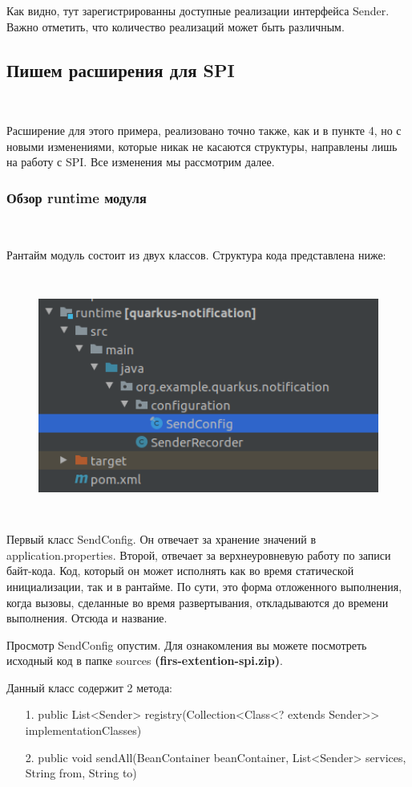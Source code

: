 \documentclass[russian,11pt]{article}
\begin{document}
Как видно, тут зарегистрированны доступные реализации интерфейса Sender. Важно отметить, что количество реализаций может быть различным.

\subsection{Пишем расширения для SPI}
~

Расширение для этого примера, реализовано точно также, как и в пункте 4, но с новыми изменениями, которые никак не касаются структуры, направлены лишь на работу с SPI. Все изменения мы рассмотрим далее.
\subsubsection{Обзор runtime модуля}
~

Рантайм модуль состоит из двух классов. Структура кода представлена ниже:

\begin{figure}[H]
	\centering
	\includegraphics[width=15cm, height=8cm]{14}
\end{figure}

Первый класс SendConfig. 
Он отвечает за хранение значений в application.properties.
Второй, отвечает за верхнеуровневую работу по записи байт-кода. Код, который он может исполнять как во время статической инициализации, так и в рантайме. По сути, это форма отложенного выполнения, когда вызовы, сделанные во время развертывания, откладываются до времени выполнения. Отсюда и название.

Просмотр SendConfig опустим. Для ознакомления вы можете посмотреть исходный код в папке sources \textbf{(firs-extention-spi.zip)}.

Данный класс содержит 2 метода:
\begin{enumerate}
		\item[  1.] public List<Sender> registry(Collection<Class<? extends Sender>> implementationClasses)
		\item[  2.] public void sendAll(BeanContainer beanContainer, List<Sender> services, String from, String to)
\end{enumerate} 
\end{document}
